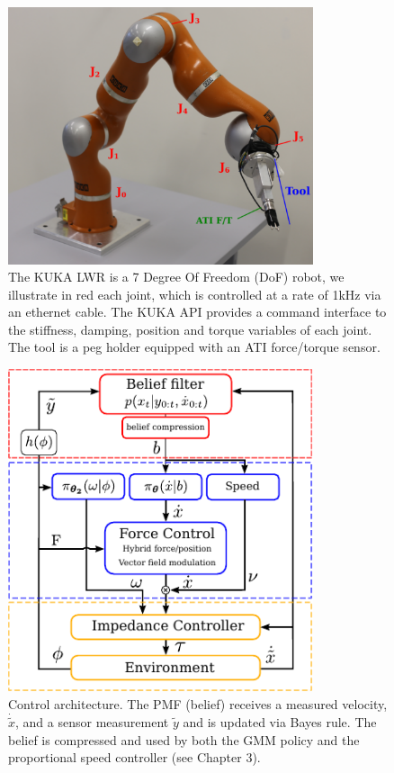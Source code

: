 \begin{figure}
 \centering
 \includegraphics[width=0.8\textwidth]{./ch4-PiH/Figures/kuka.pdf}
 \caption{The KUKA LWR is a 7 Degree Of Freedom (DoF) robot, we illustrate in red each joint, which is controlled at a rate of 1kHz via an ethernet cable. The KUKA API provides a command interface to the 
 stiffness, damping, position and torque variables of each joint. The tool is a peg holder equipped with an ATI force/torque sensor.}
 \label{fig:kuka}
\end{figure}

\begin{figure}
  \centering
  \includegraphics[width=0.8\textwidth]{./ch4-PiH/Figures/control_flow_final.pdf}
  \caption{Control architecture. The PMF (belief) receives a measured velocity, $\dot{\tilde{x}}$, and 
  a sensor measurement $\tilde{y}$ and is updated via Bayes rule. The belief is compressed and used by both the GMM policy and the proportional speed controller (see Chapter 3).}
  \label{fig:control_flow}
\end{figure}


